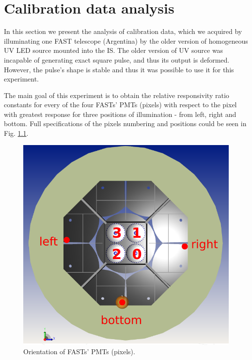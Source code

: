 
\chapter{Calibration data analysis}
\label{chap7}
In this section we present the analysis of calibration data, which we acquired by illuminating one FAST telescope (Argentina) by the older version of homogeneous UV LED source mounted into the IS. The older version of UV source was incapable of generating exact square pulse, and thus its output is deformed. However, the pulse's shape is stable and thus it was possible to use it for this experiment.   

\par
The main goal of this experiment is to obtain the relative responsivity ratio constants for every of the four FASTs' PMTs (pixels) with respect to the pixel with greatest response for three positions of illumination - from left, right and bottom. Full specifications of the pixels numbering and positions could be seen in Fig. \ref{PMT orientation}.

\begin{figure}[H]
 \centering
 \includegraphics[scale=0.35, angle = 0]{./pictures/orientation2.png}
 \caption{Orientation of FASTs' PMTs (pixels).}
 \label{PMT orientation}
 
\end{figure}

